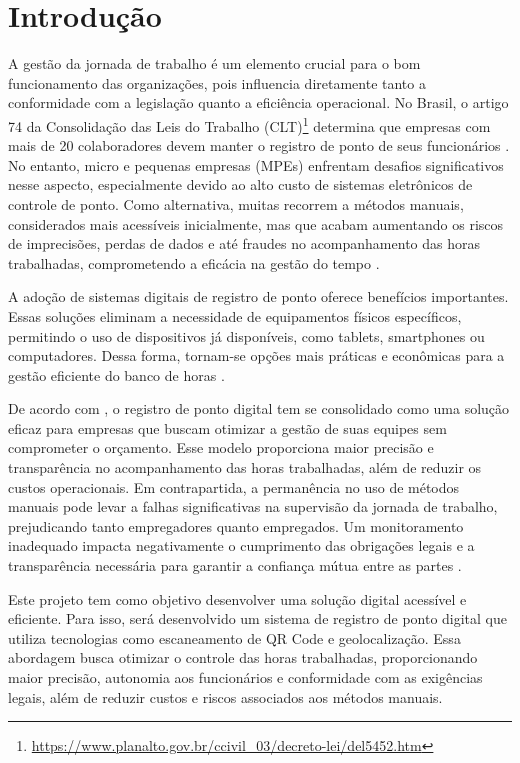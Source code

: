 \chapter{Introdução}

A gestão da jornada de trabalho é um elemento crucial para o bom funcionamento das organizações, pois influencia diretamente tanto a conformidade com a legislação quanto a eficiência operacional. No Brasil, o artigo 74 da Consolidação das Leis do Trabalho (CLT)\footnote{\url{https://www.planalto.gov.br/ccivil_03/decreto-lei/del5452.htm}} determina que empresas com mais de 20 colaboradores devem manter o registro de ponto de seus funcionários \cite{brasil1943}. No entanto, micro e pequenas empresas (MPEs) enfrentam desafios significativos nesse aspecto, especialmente devido ao alto custo de sistemas eletrônicos de controle de ponto. Como alternativa, muitas recorrem a métodos manuais, considerados mais acessíveis inicialmente, mas que acabam aumentando os riscos de imprecisões, perdas de dados e até fraudes no acompanhamento das horas trabalhadas, comprometendo a eficácia na gestão do tempo \cite{miranda2023}.

A adoção de sistemas digitais de registro de ponto oferece benefícios importantes. Essas soluções eliminam a necessidade de equipamentos físicos específicos, permitindo o uso de dispositivos já disponíveis, como tablets, smartphones ou computadores. Dessa forma, tornam-se opções mais práticas e econômicas para a gestão eficiente do banco de horas \cite{FlorindoBianchi2022}.
 
De acordo com \textcite{gomes2023}, o registro de ponto digital tem se consolidado como uma solução eficaz para empresas que buscam otimizar a gestão de suas equipes sem comprometer o orçamento. Esse modelo proporciona maior precisão e transparência no acompanhamento das horas trabalhadas, além de reduzir os custos operacionais. Em contrapartida, a permanência no uso de métodos manuais pode levar a falhas significativas na supervisão da jornada de trabalho, prejudicando tanto empregadores quanto empregados. Um monitoramento inadequado impacta negativamente o cumprimento das obrigações legais e a transparência necessária para garantir a confiança mútua entre as partes \cite{abreu2016sistema}.

Este projeto tem como objetivo desenvolver uma solução digital acessível e eficiente. Para isso, será desenvolvido um sistema de registro de ponto digital que utiliza tecnologias como escaneamento de QR Code e geolocalização. Essa abordagem busca otimizar o controle das horas trabalhadas, proporcionando maior precisão, autonomia aos funcionários e conformidade com as exigências legais, além de reduzir custos e riscos associados aos métodos manuais. 

